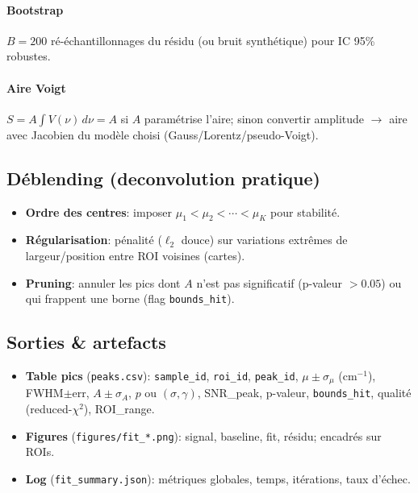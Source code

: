 \paragraph{Bootstrap} $B=200$ ré-échantillonnages du résidu (ou bruit synthétique) pour IC 95\% robustes.
\paragraph{Aire Voigt} $S = A \int V(\nu)\,d\nu = A$ si $A$ paramétrise l'aire; sinon convertir amplitude $\rightarrow$ aire avec Jacobien du modèle choisi (Gauss/Lorentz/pseudo-Voigt).

\subsection{Déblending (deconvolution pratique)}
\begin{itemize}[nosep]
\item \textbf{Ordre des centres}: imposer $\mu_1<\mu_2<\cdots<\mu_K$ pour stabilité.
\item \textbf{Régularisation}: pénalité ($\ell_2$ douce) sur variations extrêmes de largeur/position entre ROI voisines (cartes).
\item \textbf{Pruning}: annuler les pics dont $A$ n'est pas significatif (p-valeur $>0.05$) ou qui frappent une borne (flag \texttt{bounds\_hit}).
\end{itemize}

\subsection{Sorties \& artefacts}
\begin{itemize}[nosep]
\item \textbf{Table pics} (\texttt{peaks.csv}): \texttt{sample\_id}, \texttt{roi\_id}, \texttt{peak\_id}, $\mu\pm\sigma_\mu$ (cm$^{-1}$), FWHM$\pm$err, $A\pm\sigma_A$, $p$ ou $(\sigma,\gamma)$, SNR\_peak, p-valeur, \texttt{bounds\_hit}, qualité (reduced-$\chi^2$), ROI\_range.
\item \textbf{Figures} (\texttt{figures/fit\_*.png}): signal, baseline, fit, résidu; encadrés sur ROIs.
\item \textbf{Log} (\texttt{fit\_summary.json}): métriques globales, temps, itérations, taux d'échec.
\end{itemize}

